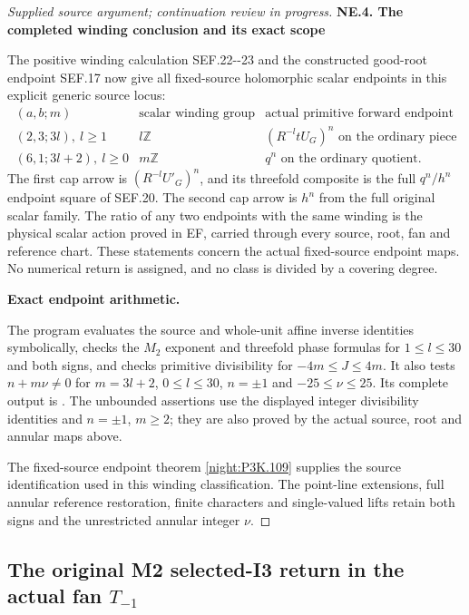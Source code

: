 \begin{proof}[Supplied source argument; continuation review in progress]
\par

\medskip\noindent\textbf{NE.4. The completed winding conclusion and its exact scope}

\par\nobreak

The positive winding calculation SEF.22-\/-23 and the constructed
good-root endpoint SEF.17 now give all fixed-source holomorphic
scalar endpoints in this explicit generic source locus:
\[
 \begin{array}{c|c|c}
 (a,b;m)&\text{scalar winding group}&\text{actual primitive forward endpoint}\\
 (2,3;3l),\ l\ge1&l\mathbb Z&(R^{-l}tU_G)^n\text{ on the ordinary piece}\\
 (6,1;3l+2),\ l\ge0&m\mathbb Z&q^n\text{ on the ordinary quotient}.
 \end{array}
 \tag{NE.11}
\]
The first cap arrow is \((R^{-l}U'_G)^n\), and its threefold
composite is the full \(q^n/h^n\) endpoint square of SEF.20.
The second cap arrow is \(h^n\) from the full original scalar
family. The ratio of any two endpoints with the same winding is
the physical scalar action proved in EF, carried through every
source, root, fan and reference chart. These statements concern
the actual fixed-source endpoint maps. No numerical return is
assigned, and no class is divided by a covering degree.


\par\medskip\noindent\textbf{Exact endpoint arithmetic.}\par
The program  evaluates the source and whole-unit affine
inverse identities symbolically, checks the $M_2$ exponent and threefold
phase formulas for $1\leq l\leq30$ and both signs, and checks primitive
divisibility for $-4m\leq J\leq4m$. It also tests
$n+m\nu\ne0$ for $m=3l+2$, $0\leq l\leq30$,
$n=\pm1$ and $-25\leq\nu\leq25$. Its complete output is
. The unbounded assertions use the displayed
integer divisibility identities and $n=\pm1$, $m\geq2$; they are also
proved by the actual source, root and annular maps above.

The fixed-source endpoint theorem \cref{night:P3K.109} supplies the
source identification used in this winding classification. The point-line
extensions, full annular reference restoration, finite characters and
single-valued lifts retain both signs and the unrestricted annular
integer $\nu$.


\end{proof}


\subsection{The original M2 selected-I3 return in the actual fan \texorpdfstring{\(T_{-1}\)}{T-1}}
